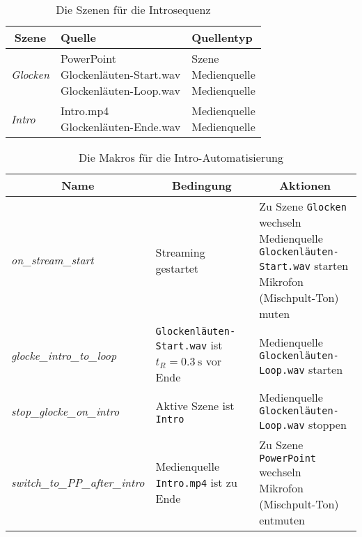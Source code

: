 				\begin{table}[H]
					\caption{Die Szenen für die Introsequenz}
					\centering

					\begin{tabular}{lll}
						\toprule
						\multicolumn{1}{c}{Szene} & Quelle & Quellentyp \\
						\midrule
						\textit{Glocken} & \parbox{0.3\textwidth}{PowerPoint\\Glockenläuten-Start.wav\\Glockenläuten-Loop.wav} & \parbox{0.2\textwidth}{Szene\\Medienquelle\\Medienquelle} \\ \midrule
						\textit{Intro} & \parbox{0.3\textwidth}{Intro.mp4\\Glockenläuten-Ende.wav} & \parbox{0.2\textwidth}{Medienquelle\\Medienquelle} \\
						\bottomrule
					\end{tabular}
				\end{table}

				\begin{table}[H]
					\caption{Die Makros für die Intro-Automatisierung}
					\centering

					\begin{tabular}{lll}
						\toprule
						\multicolumn{1}{c}{Name} & \multicolumn{1}{c}{Bedingung} & \multicolumn{1}{c}{Aktionen} \\
						\midrule
						\textit{on\_stream\_start} & Streaming gestartet & \parbox{0.5\textwidth}{
								Zu Szene \texttt{Glocken} wechseln\\
								Medienquelle \texttt{Glocken\-läuten-Start.wav} starten\\
								Mikrofon (Mischpult-Ton) muten
						} \\ \midrule
						\textit{glocke\_intro\_to\_loop} & \parbox{0.25\textwidth}{\texttt{Glocken\-läuten-Start.wav} ist $t_R = \SI{0,3}{\second}$ vor Ende} & \parbox{0.5\textwidth}{Medienquelle \texttt{Glocken\-läuten-Loop.wav} starten} \\ \midrule
						\textit{stop\_glocke\_on\_intro} & Aktive Szene ist \texttt{Intro} & \parbox{0.5\textwidth}{Medienquelle \texttt{Glocken\-läuten-Loop.wav} stoppen} \\ \midrule
						\textit{switch\_to\_PP\_after\_intro} & \parbox{0.25\textwidth}{Medienquelle \texttt{Intro.mp4} ist zu Ende} & \parbox{0.5\textwidth}{
							Zu Szene \texttt{PowerPoint} wechseln\\
							Mikrofon (Mischpult-Ton) entmuten
						} \\
						\bottomrule
					\end{tabular}
				\end{table}
